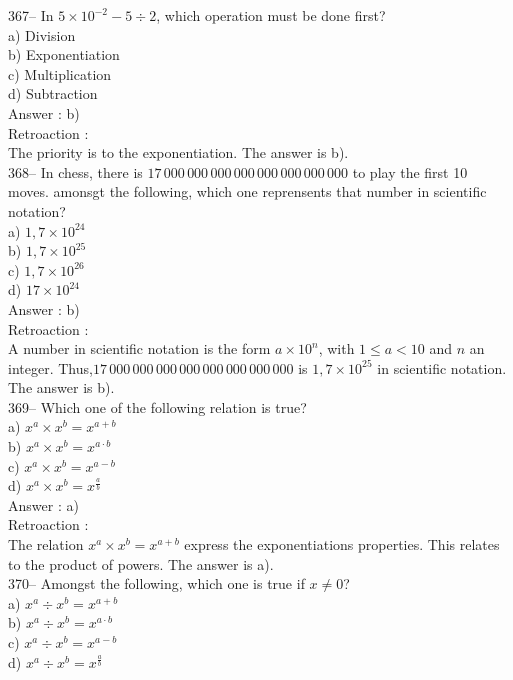 ﻿\documentclass[letterpaper, 12pt]{article}
\begin{document}
367-- In $5\times10^{-2}-5\div2$, which operation must be done first?\\
a) Division\\
b) Exponentiation\\
c) Multiplication\\
d) Subtraction\\

Answer : b)\\

Retroaction : \\
The priority is to the exponentiation. The answer is b).\\

368-- In chess, there is $17\,000\,000\,000\,000\,000\,000\,000\,000$
to play the first 10 moves.  amonsgt the following, which one reprensents that number in scientific notation?\\
a) $1,7\times10^{24}$\\
b) $1,7\times10^{25}$\\
c) $1,7\times10^{26}$\\
d) $17\times10^{24}$\\

Answer : b)\\

Retroaction : \\
A number in scientific notation is the form $a\times10^{n}$, with
$1\leq a<10$ and $n$ an integer.  
Thus,$17\,000\,000\,000\,000\,000\,000\,000\,000$ is $1,7\times10^{25}$ in scientific notation. The answer is b).\\

369--  Which one of the following relation is true?\\
a) $x^{a}\times x^{b}=x^{a+b}$\\
b) $x^{a}\times x^{b}=x^{a\cdot b}$\\
c) $x^{a}\times x^{b}=x^{a-b}$\\
d) $x^{a}\times x^{b}=x^{\frac{a}{b}}$\\

Answer : a)\\

Retroaction : \\
The relation $x^{a}\times x^{b}=x^{a+b}$ express the exponentiations properties. 
This relates to the product of powers.  
The answer is a).\\

370--  Amongst the following, which one is true if $x \neq 0$?\\
a) $x^{a}\div x^{b}=x^{a+b}$\\
b) $x^{a}\div x^{b}=x^{a\cdot b}$\\
c) $x^{a}\div x^{b}=x^{a-b}$\\
d) $x^{a}\div x^{b}=x^{\frac{a}{b}}$\\
\end{document}
